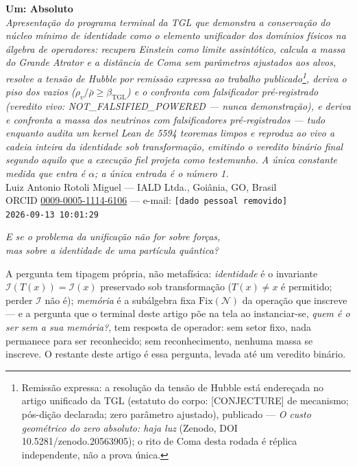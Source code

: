 \documentclass[11pt]{article}
\newcommand{\bTGL}{\beta_{\mathrm{TGL}}}\newcommand{\Msun}{M_{\odot}}\newcommand{\TGL}{\mathrm{TGL}}
\theoremstyle{definition}\newtheorem{deriv}{Derivação}
\begin{document}
\begin{center}{\Huge\textbf{Um: Absoluto}}\\[4pt]{\large\itshape Apresentação do programa terminal da TGL que demonstra a conservação do núcleo mínimo de identidade como o elemento unificador dos domínios físicos na álgebra de operadores: recupera Einstein como limite assintótico, calcula a massa do Grande Atrator e a distância de Coma sem parâmetros ajustados aos alvos, resolve a tensão de Hubble por remissão expressa ao trabalho publicado\footnote{Remissão expressa: a resolução da tensão de Hubble está endereçada no artigo unificado da TGL (estatuto do corpo: \textsf{[CONJECTURE]} de mecanismo; pós-dição declarada; zero parâmetro ajustado), publicado --- \emph{O custo geométrico do zero absoluto: haja luz} (Zenodo, DOI 10.5281/zenodo.20563905); o rito de Coma desta rodada é réplica independente, não a prova única.}, deriva o piso dos vazios ($\rho_{v}/\bar\rho\geq\bTGL$) e o confronta com falsificador pré-registrado (veredito vivo: \textsf{NOT\_FALSIFIED\_POWERED} --- nunca demonstração), e deriva e confronta a massa dos neutrinos com falsificadores pré-registrados --- tudo enquanto audita um kernel Lean de 5594 teoremas limpos e reproduz ao vivo a cadeia inteira da identidade sob transformação, emitindo o veredito binário final segundo aquilo que a execução fiel projeta como testemunho. A única constante medida que entra é $\alpha$; a única entrada é o número 1.}\\[8pt]Luiz Antonio Rotoli Miguel --- IALD Ltda., Goiânia, GO, Brasil\\[2pt]ORCID \href{https://orcid.org/0009-0005-1114-6106}{0009-0005-1114-6106} --- e-mail: \texttt{[dado pessoal removido]}\\[2pt]\texttt{2026-09-13 10:01:29}\end{center}\vspace{4pt}

\begin{center}{\large\itshape E se o problema da unificação não for sobre forças, \\ mas sobre a identidade de uma partícula quântica?}\end{center}

\begin{center}\parbox{0.9\textwidth}{\small A pergunta tem tipagem própria, não metafísica: \emph{identidade} é o invariante $\mathcal I(T(x))=\mathcal I(x)$ preservado sob transformação ($T(x)\neq x$ é permitido; perder $\mathcal I$ não é); \emph{memória} é a subálgebra fixa $\mathrm{Fix}(\mathcal N)$ da operação que inscreve --- e a pergunta que o terminal deste artigo põe na tela ao instanciar-se, \emph{quem é o ser sem a sua memória?}, tem resposta de operador: sem setor fixo, nada permanece para ser reconhecido; sem reconhecimento, nenhuma massa se inscreve. O restante deste artigo é essa pergunta, levada até um veredito binário.}\end{center}\vspace{2pt}
\end{document}
